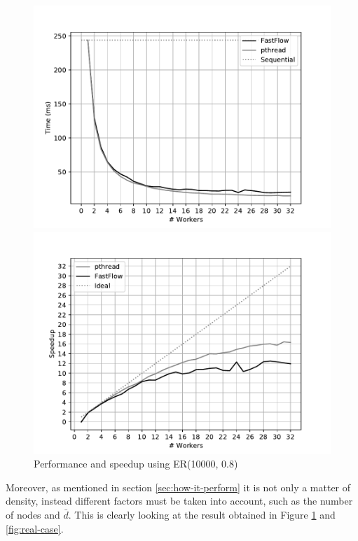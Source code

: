\begin{figure}[!htb]
\begin{minipage}{0.48\textwidth}
        \includegraphics[width=\textwidth]{plots/fastflow_performance_08_time.pdf}
    \end{minipage}
    \begin{minipage}{0.48\textwidth}
        \includegraphics[width=\textwidth]{plots/fastflow_speedup_08_time.pdf}
    \end{minipage}
    \caption{Performance and speedup using ER(10000, 0.8)}
    \label{fig:perf_08}
\end{figure}

Moreover, as mentioned in section \ref{sec:how-it-perform} it is not only a matter of density, instead different factors must be taken into account, such as the number of nodes and $\bar{d}$. This is clearly looking at the result obtained in Figure \ref{fig:perf_08} and \ref{fig:real-case}.

